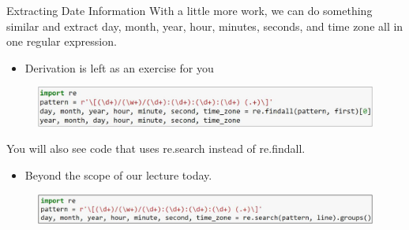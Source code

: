 \documentclass[aspectratio=169]{../latex_main/tntbeamer}  %
\begin{document}
	\begin{frame}{Extracting Date Information}
    	With a little more work, we can do something similar and extract day, month, year, hour, minutes, seconds, and time zone all in one regular expression.
    	\begin{itemize}
    	    \item Derivation is left as an exercise for you
    	\end{itemize}
    	\begin{figure}
    	    \centering
    	    \includegraphics[scale=.6]{Bild25}
    	\end{figure}
    	You will also see code that uses re.search instead of re.findall.
    	\begin{itemize}
    	    \item Beyond the scope of our lecture today.
    	\end{itemize}
    	\begin{figure}
    	    \centering
    	    \includegraphics[scale=.65]{Bild26}
    	\end{figure}
	\end{frame}
\end{document}
